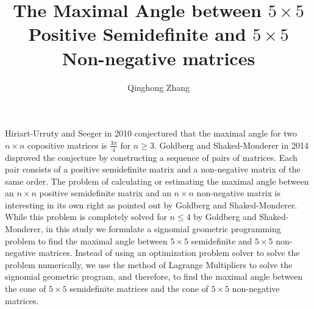 \documentclass[a4paper]{amsart}
\date{}
\begin{document}
\title{The Maximal Angle between $5\times 5$ Positive Semidefinite and $5\times 5$ Non-negative matrices
}
\author{Qinghong Zhang} %
\address{Northern Michigan University} %

\maketitle

Hiriart-Urruty and Seeger in 2010 conjectured that the maximal angle for two $n\times n$ copositive matrices is $\frac{3\pi}{4}$ for $n\ge 3$. Goldberg and Shaked-Monderer in 2014 disproved the conjecture by constructing a sequence of pairs of matrices. Each pair consists of a positive semidefinite matrix and a non-negative matrix of the same order. The problem of calculating or estimating the maximal angle between an $n\times n$ positive semidefinite matrix and an $n\times n$ non-negative matrix  is interesting in its own right as pointed out by Goldberg and Shaked-Monderer. While this problem is completely solved for $n\le  4$  by Goldberg and Shaked-Monderer, in this study we formulate a signomial geometric programming problem  to find the maximal angle  between  $5\times 5$ semidefinite  and $5\times 5$ non-negative matrices.  Instead of using an optimization problem solver to solve the problem numerically, we use the method of Lagrange Multipliers to solve the signomial geometric program, and therefore, to find the maximal angle between the cone of $5\times 5$ semidefinite matrices and the cone of $5\times 5$ non-negative matrices.
\end{document}
